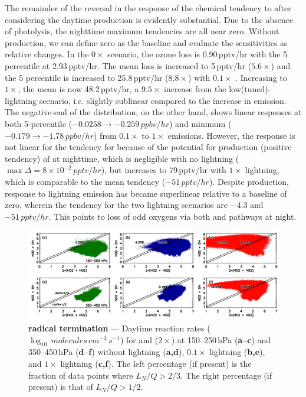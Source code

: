 The remainder of the reversal in the response of the  chemical tendency to {\lnox} after considering the
daytime production is evidently substantial. Due to the absence of photolysis, the nighttime maximum tendencies
are all near zero. Without production, we can define zero as the baseline and evaluate the sensitivities as
relative changes. In the $0\times$ scenario, the ozone loss is 0.90\,\unit{pptv/hr} with the 5 percentile at 2.93\,\unit{pptv/hr}.
The mean loss is increased to 5\,\unit{pptv/hr} ($5.6\times$) and the 5 percentile is increased to 25.8\,\unit{pptv/hr}
($8.8\times$) with $0.1\times$ {\lnox}. Increasing {\lnox} to $1\times$, the mean is now 48.2\,\unit{pptv/hr}, a $9.5\times$
increase from the low(tuned)-lightning scenario, i.e. slightly sublinear compared to the increase in emission. The
negative-end of the distribution, on the other hand, shows linear responses at both 5-percentile ($-0.0258\rightarrow-0.259\,\unit{ppbv/hr}$)
and minimum ($-0.179\rightarrow-1.78\,\unit{ppbv/hr}$) from $0.1\times$ to $1\times$ emissions. However, the response
is not linear for the tendency for  because of the potential for production (positive tendency) of 
at nighttime, which is negligible with no lightning ($\max\Delta = 8\times10^{-2}\,\unit{pptv/hr}$), but increases to 79\,\unit{pptv/hr}
with $1\times$ lightning, which is comparable to the mean tendency ($-51\,\unit{pptv/hr}$). Despite production, response
to lightning emission has became superlinear relative to a baseline of zero, wherein the  tendency for
the two lightning scenarios are $-4.3$ and $-51\,\unit{pptv/hr}$. This points to loss of odd oxygens via both  and
 pathways at night.

	\begin{figure}[t!]
		\centering
		\includegraphics[width=1.0\textwidth]{sens/rxn}
		
		\caption[ radical termination]{\label{fig:2006/ltngsens_rxn}\textbf{ radical termination}
		--- Daytime reaction rates ($\log_{10}\,\unit{molecules\,cm^{-3}\,s^{-1}}$) for  and ($2\times$)
		 at 150--250\,\unit{hPa} ({\bf a--c}) and 350--450\,\unit{hPa} ({\bf d--f}) without lightning ({\bf a,d}),
		$0.1\times$ lightning ({\bf b,e}), and $1\times$ lightning ({\bf c,f}). The left percentage (if present) is the fraction
		of data points where $L_N/Q>2/3$. The right percentage (if present) is that of $L_N/Q>1/2$.}\vspace{-.3in}
	\end{figure}

